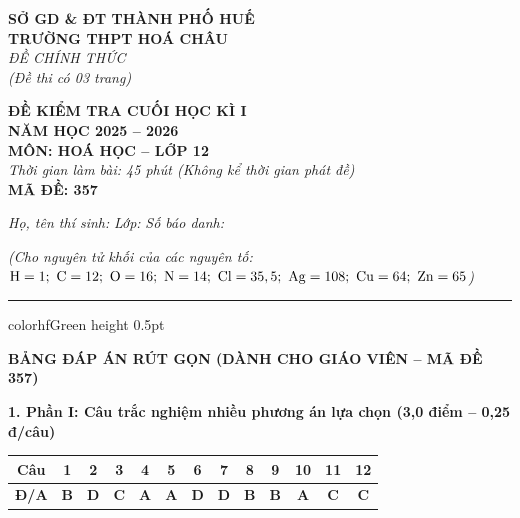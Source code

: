 \documentclass[11pt,a4paper]{article}
\begin{document}
\begin{minipage}[t]{0.48\textwidth}
\textbf{SỞ GD \& ĐT THÀNH PHỐ HUẾ}\\
\textbf{TRƯỜNG THPT HOÁ CHÂU}\\
\textit{ĐỀ CHÍNH THỨC}\\
\textit{(Đề thi có 03 trang)}
\end{minipage}
\hfill
\begin{minipage}[t]{0.48\textwidth}
\raggedleft
\textbf{\color{hfRed}ĐỀ KIỂM TRA CUỐI HỌC KÌ I}\\
\textbf{NĂM HỌC 2025 -- 2026}\\
\textbf{MÔN: HOÁ HỌC -- LỚP 12}\\
\textit{Thời gian làm bài: 45 phút (Không kể thời gian phát đề)}\\
\textbf{MÃ ĐỀ: 357}
\end{minipage}

\vspace{4pt}
\noindent
\textit{Họ, tên thí sinh:} \dotfill \textit{Lớp:} \dotfill \textit{Số báo danh:} \dotfill

\vspace{3pt}
\noindent
\textit{\footnotesize (Cho nguyên tử khối của các nguyên tố: $\ce{H}=1;\ \ce{C}=12;\ \ce{O}=16;\ \ce{N}=14;\ \ce{Cl}=35,5;\ \ce{Ag}=108;\ \ce{Cu}=64;\ \ce{Zn}=65$)}

\vspace{3pt}
\hrule color{hfGreen} height 0.5pt

\vspace{6pt}
\begin{center}
{\Large\textbf{\color{hfRed}BẢNG ĐÁP ÁN RÚT GỌN (DÀNH CHO GIÁO VIÊN -- MÃ ĐỀ 357)}}
\end{center}

\vspace{2pt}
\noindent
\textbf{\color{mainGreen}1. Phần I: Câu trắc nghiệm nhiều phương án lựa chọn (3,0 điểm -- 0,25 đ/câu)}
\begin{center}
\renewcommand{\arraystretch}{1.2}
\setlength{\tabcolsep}{5pt}
\begin{tabular}{|c|c|c|c|c|c|c|c|c|c|c|c|c|}
\hline
\rowcolor{tableGreen}
\textbf{Câu} & \textbf{1} & \textbf{2} & \textbf{3} & \textbf{4} & \textbf{5} & \textbf{6} & \textbf{7} & \textbf{8} & \textbf{9} & \textbf{10} & \textbf{11} & \textbf{12} \\
\hline
\textbf{Đ/A} & \textbf{\color{hfRed}B} & \textbf{\color{hfRed}D} & \textbf{\color{hfRed}C} & \textbf{\color{hfRed}A} & \textbf{\color{hfRed}A} & \textbf{\color{hfRed}D} & \textbf{\color{hfRed}D} & \textbf{\color{hfRed}B} & \textbf{\color{hfRed}B} & \textbf{\color{hfRed}A} & \textbf{\color{hfRed}C} & \textbf{\color{hfRed}C} \\
\hline
\end{tabular}
\end{center}
\end{document}
